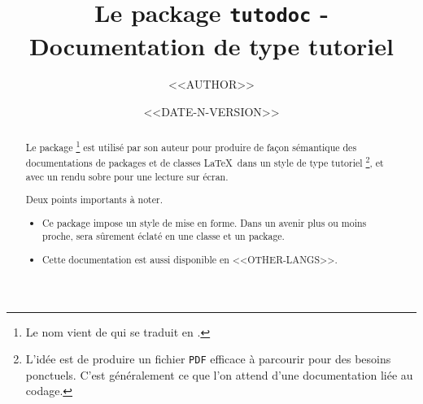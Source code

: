 \documentclass[12pt, a4paper]{article}
\begin{document}
\title{Le package \texttt{tutodoc} - Documentation de type tutoriel}
\author{<<AUTHOR>>}
\date{<<DATE-N-VERSION>>}

\maketitle

\begin{abstract}
    Le package \thispack{}
    \footnote{
        Le nom vient de  qui se traduit en .
    }
    est utilisé par son auteur pour produire de façon sémantique des documentations de packages et de classes \LaTeX\ dans un style de type tutoriel
    \footnote{
        L'idée est de produire un fichier \texttt{PDF} efficace à parcourir pour des besoins ponctuels. C'est généralement ce que l'on attend d'une documentation liée au codage.
    },
    et avec un rendu sobre pour une lecture sur écran.

    \medskip

    \noindent
    Deux points importants à noter.
    \begin{itemize}
        \item Ce package impose un style de mise en forme. Dans un avenir plus ou moins proche, \thispack{} sera sûrement éclaté en une classe et un package.

        \item Cette documentation est aussi disponible en <<OTHER-LANGS>>.
    \end{itemize}
\end{abstract}
\end{document}
